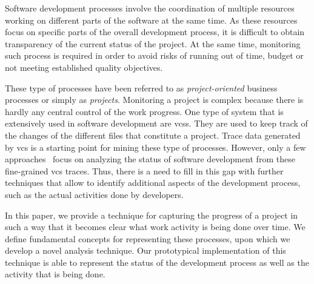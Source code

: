 
Software development processes involve the coordination of multiple resources working on different parts of the software at the same time. As these resources focus on specific parts of the overall development process, it is difficult to obtain  transparency of the current status of the project. At the same time, monitoring such process is required in order to avoid risks of running out of time, budget or not meeting established quality objectives.

These type of processes have been referred to as \emph{project-oriented} business processes or simply as \emph{projects}. Monitoring a project is complex because there is hardly any central control of the work progress. 
One type of system that is extensively used in software development are \glspl{vcs}.
They are used to keep track of the changes of the different files that constitute a project. Trace data generated by \gls{vcs} is a starting point for mining these type of processes. However, only a few approaches~\citep{DBLP:conf/bpm/BalaCMRP15,DBLP:conf/bpm/JookenCJ19} focus on analyzing the status of software development from these fine-grained \gls{vcs} traces. Thus, there is a need to fill in this gap with further techniques that allow to identify additional aspects of the development process, such as the actual activities done by developers. 


In this paper, we provide a technique for capturing the progress of a project in such a way that it becomes clear what work activity is being done over time. We define fundamental concepts for representing these processes, upon which we develop a novel analysis technique. Our prototypical implementation of this technique is able to represent the status of the development process as well as the activity that is being done. 


